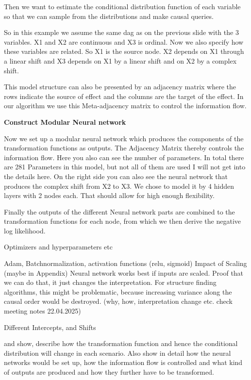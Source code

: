 Then we want to estimate the conditional distribution function of each variable so that we can sample from the distributions and make causal queries.

So in this example we assume the same dag as on the previous slide with the 3 variables. X1 and X2 are continuous and X3 is ordinal. Now we also specify how these variables are related. So X1 is the source node. X2 depends on X1 through a linear shift and X3 depends on X1 by a linear shift and on X2 by a complex shift.


This model structure can also be presented by an adjacency matrix where the rows indicate the source of effect and the columns are the target of the effect. In our algorithm we use this Meta-adjacency matrix to control the information flow.





\textbf{Construct Modular Neural network}

Now we set up a modular neural network which produces the components of the transformation functions as outputs. The Adjacency Matrix thereby controls the information flow. Here you also can see the number of parameters. In total there are 281 Parameters in this model, but not all of them are used I will not get into the details here. On the right side you can also see the neural network that produces the complex shift from X2 to X3. We chose to model it by 4 hidden layers with 2 nodes each. That should allow for high enough flexibility.

Finally the outputs of the different Neural network parts are combined to the transformation functions for each node, from which we then derive the negative log likelihood.

Optimizers and hyperparameters etc

Adam, Batchnormalization, activation functions (relu, sigmoid)
Impact of Scaling (maybe in Appendix)
Neural network works best if inputs are scaled. Proof that we can do that, it just changes the interpretation. For structure finding algorithms, this might be problematic, because increasing variance along the causal order would be destroyed. (why, how, interpretation change etc. check meeting notes 22.04.2025)

Different Intercepts, and Shifts

and show, describe how the transformation function and hence the conditional distribution will change in each scenario. Also show in detail how the neural networks would be set up, how the information flow is controlled and what kind of outputs are produced and how they further have to be transformed.

